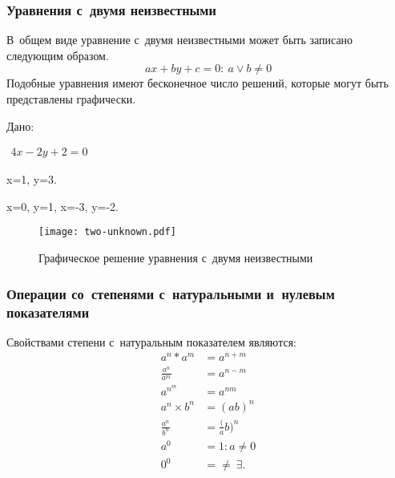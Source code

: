 \documentclass[]{scrartcl}
\begin{document}
\subsubsection{Уравнения с~двумя неизвестными}\label{Two-unknown-1}
В~общем виде уравнение с~двумя неизвестными может быть записано следующим образом.
\begin{equation}\label{eq:two-unknown}
ax+by+c=0:\ a \vee b \neq 0
\end{equation}
Подобные уравнения имеют бесконечное число решений, которые могут быть представлены графически.

\begin{Thexmpl}\label{ex:two-unknown}
	Дано:
	
	$\begin{aligned}
	4x-2y+2=0
	\end{aligned}$
	
	 x=1, y=3.
	
	 x=0, y=1, x=-3, y=-2. 
		
\end{Thexmpl}

\begin{figure}[ht]
	\centering %
	\texttt{[image: two-unknown.pdf]}
	\caption{Графическое решение уравнения с~двумя неизвестными}\label{fig:two-unknown}
\end{figure}

\subsubsection{Операции со~степенями с~натуральными и~нулевым показателями}

Свойствами степени с~натуральным показателем являются:
\begin{equation}\label{eq:nat-degrees-prop-1}
	\begin{aligned}
	a^n*a^m &= a^{n+m} \\
	\frac{a^n}{a^m} &=a^{n-m} \\
	a^{n^{m}} &= a^{nm} \\
	a^n \times b^n &= (ab)^n \\
	\frac{a^n}{b^n} &= \frac({a}{b})^n \\
	a^0 &= 1: a \neq 0 \\
	0^0 &= \neq \ \exists.
	\end{aligned}
\end{equation}
\end{document}
